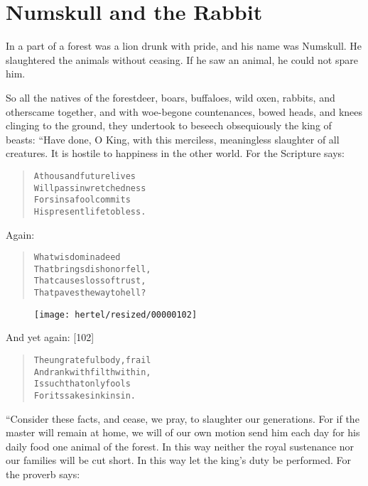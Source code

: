 \documentclass[article, twoside, 10pt]{memoir}
\renewenvironment{verbatim}{%
\begin{quote}%
\vskip -10pt%
\begin{alltt}\normalfont\small}{\end{alltt}%
\end{quote}%
\vskip -10pt
} %
\begin{document}
\chapter{Numskull and the Rabbit}

In a part of a forest was a lion drunk with pride, and his name was
Numskull. He slaughtered the animals without ceasing. If he saw an
animal, he could not spare him.

So all the natives of the forest{\textemdash}deer, boars, buffaloes, wild
oxen, rabbits, and others{\textemdash}came together, and with woe-begone
countenances, bowed heads, and knees clinging to the ground, they
undertook to beseech obsequiously the king of beasts: “Have done, O
King, with this merciless, meaningless slaughter of all creatures.
It is hostile to happiness in the other world. For the Scripture
says:

\begin{verbatim}
A thousand future lives
    Will pass in wretchedness
For sins a fool commits
    His present life to bless.
\end{verbatim}
Again:

\begin{verbatim}
What wisdom in a deed
    That brings dishonor fell,
That causes loss of trust,
    That paves the way to hell?
\end{verbatim}
\begin{figure}[p]\texttt{[image: hertel/resized/00000102]}\end{figure}And yet again: [102]

\begin{verbatim}
The ungrateful body, frail
    And rank with filth within,
Is such that only fools
    For its sake sink in sin.
\end{verbatim}
“Consider these facts, and cease, we pray, to slaughter our
generations. For if the master will remain at home, we will of our
own motion send him each day for his daily food one animal of the
forest. In this way neither the royal sustenance nor our families
will be cut short. In this way let the king's duty be performed.
For the proverb says:
\end{document}
